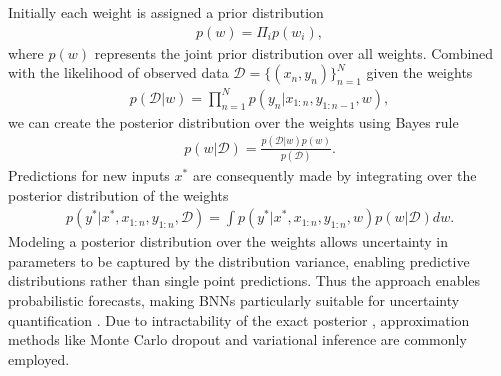 Initially each weight is assigned a prior distribution
\begin{equation}
    \begin{gathered}
        p(w) = \Pi_{i} p(w_i),
    \end{gathered}
\end{equation}
where $p(w)$ represents the joint prior distribution over all weights. Combined with the likelihood of observed data $\mathcal{D} = \{(x_n,y_n)\}_{n=1}^N$ given the weights
\begin{equation}
    \begin{gathered}    
        p(\mathcal{D}|w) = \prod_{n=1}^Np(y_n|x_{1:n}, y_{1:n-1},w),
    \end{gathered}
\end{equation}
we can create the posterior distribution over the weights using Bayes rule \parencite[p. 46]{pml1Book}
\begin{equation}
    \begin{gathered}
        p(w|\mathcal{D}) = \frac{p(\mathcal{D}|w)p(w)}{p(\mathcal{D})}.
    \end{gathered}
    \label{eq:bayes_theorem} 
\end{equation}
Predictions for new inputs $x^*$ are consequently made by integrating over the posterior distribution of the weights
\begin{equation}
    \begin{gathered}
        p(y^*|x^*, x_{1:n}, y_{1:n},\mathcal{D}) = \int p(y^*|x^*,x_{1:n}, y_{1:n},w)p(w|\mathcal{D})dw.
    \end{gathered}
\end{equation}
Modeling a posterior distribution over the weights allows uncertainty in parameters to be captured by the distribution variance, enabling predictive distributions rather than single point predictions. Thus the approach enables probabilistic forecasts, making BNNs particularly suitable for uncertainty quantification \parencite{jospin2022hands}. Due to intractability of the exact posterior \parencite{hernandez2015probabilistic}, approximation methods like Monte Carlo dropout and variational inference are commonly employed. 

